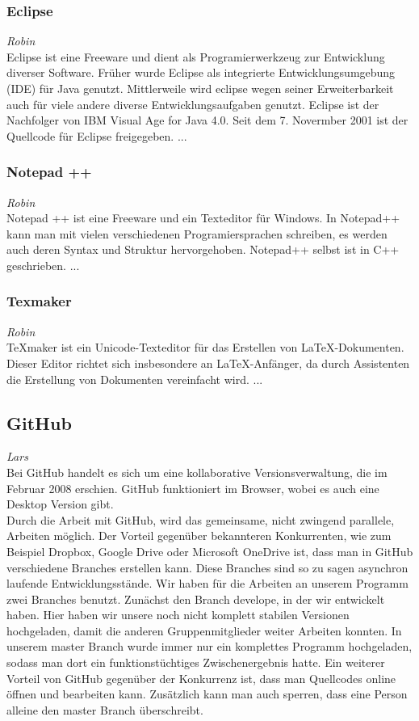 \documentclass[12pt,a4paper,bibliography=totocnumbered,listof=totocnumbered]{scrartcl}
\begin{document}
\subsubsection{Eclipse}
\label{sec:Eclipse}
\emph{Robin}\\
Eclipse ist eine Freeware und dient als Programierwerkzeug zur Entwicklung diverser Software. Früher wurde Eclipse als integrierte Entwicklungsumgebung (IDE) für Java genutzt. Mittlerweile wird eclipse wegen seiner Erweiterbarkeit auch für viele andere diverse Entwicklungsaufgaben genutzt. Eclipse ist der Nachfolger von IBM Visual Age for Java 4.0. Seit dem 7. Novermber 2001 ist der Quellcode für Eclipse freigegeben. \cite{Eclipse}
...

\subsubsection{Notepad ++}
\label{sec:Notepad++}
\emph{Robin}\\
Notepad ++ ist eine Freeware und ein Texteditor für Windows. In Notepad++ kann man mit vielen verschiedenen Programiersprachen schreiben, es werden auch deren Syntax und Struktur hervorgehoben. Notepad++ selbst ist in C++ geschrieben. \cite{Notepad}
...

\subsubsection{Texmaker}
\label{sec:Texmaker}
\emph{Robin}\\
TeXmaker ist ein Unicode-Texteditor für das Erstellen von LaTeX-Dokumenten. Dieser Editor richtet sich insbesondere an LaTeX-Anfänger, da durch Assistenten die Erstellung von Dokumenten vereinfacht wird. \cite{Texmaker}
...

\subsection{GitHub}
\label{sec:GitHub}
\emph{Lars}\\
Bei GitHub handelt es sich um eine kollaborative Versionsverwaltung, die im Februar 2008 erschien. GitHub funktioniert im Browser, wobei es auch eine Desktop Version gibt.\cite{wiki/GitHub} \\
Durch die Arbeit mit GitHub, wird das gemeinsame, nicht zwingend parallele, Arbeiten möglich. Der Vorteil gegenüber bekannteren Konkurrenten, wie zum Beispiel Dropbox, Google Drive oder Microsoft OneDrive ist, dass man in GitHub verschiedene Branches erstellen kann. Diese Branches sind so zu sagen asynchron laufende Entwicklungsstände. Wir haben für die Arbeiten an unserem Programm zwei Branches benutzt. Zunächst den Branch \glqq develope\grqq , in der wir entwickelt haben. Hier haben wir unsere noch nicht komplett stabilen Versionen hochgeladen, damit die anderen Gruppenmitglieder weiter Arbeiten konnten. In unserem \glqq master\grqq{} Branch wurde immer nur ein komplettes Programm hochgeladen, sodass man dort ein funktionstüchtiges Zwischenergebnis hatte. Ein weiterer Vorteil von GitHub gegenüber der Konkurrenz ist, dass man Quellcodes online öffnen und bearbeiten kann. Zusätzlich kann man auch sperren, dass eine Person alleine den \glqq master\grqq{} Branch überschreibt.
\end{document}
